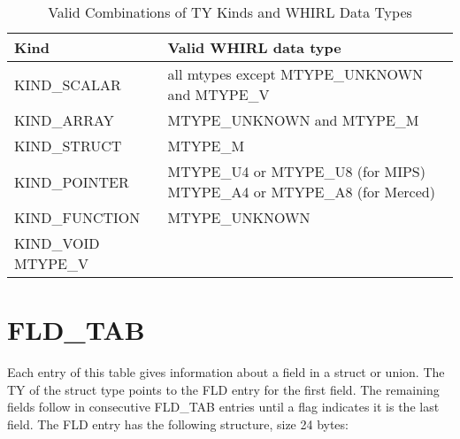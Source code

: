 \begin{table}
\centering
\caption{Valid Combinations of
%
TY Kinds and WHIRL Data Types}
\label{table20}
\begin{tabular}{|l|p{4in}|}\hline
Kind & Valid  WHIRL data type\\\hline\hline
\index{KIND\_SCALAR}%
KIND\_SCALAR & all mtypes except
\index{MTYPE\_UNKNOWN}%
MTYPE\_UNKNOWN and MTYPE\_V\\\hline
\index{KIND\_ARRAY}%
KIND\_ARRAY &
\index{MTYPE\_UNKNOWN}%
MTYPE\_UNKNOWN and
\index{MTYPE\_M}%
MTYPE\_M \\\hline
\index{KIND\_STRUCT}%
KIND\_STRUCT &
\index{MTYPE\_M}%
MTYPE\_M \\\hline
\index{KIND\_POINTER}%
KIND\_POINTER &
\index{MTYPE\_U4}%
MTYPE\_U4 or
\index{MTYPE\_U8}%
MTYPE\_U8 (for MIPS)
\index{MTYPE\_A4}%
MTYPE\_A4 or
\index{MTYPE\_A8}%
MTYPE\_A8 (for Merced) \\\hline
\index{KIND\_FUNCTION}%
KIND\_FUNCTION &
\index{MTYPE\_UNKNOWN}%
MTYPE\_UNKNOWN \\\hline
\index{KIND\_VOID}%
KIND\_VOID
\index{MTYPE\_V}%
MTYPE\_V & \\\hline
\end{tabular}
\end{table}


\section{FLD\_TAB}

Each entry of this table gives information about a field in a struct
or union. The
%
TY of the struct type points to the
%
FLD entry for the
first field.
The remaining fields follow in consecutive
%
FLD\_TAB entries until a
flag indicates it is the last field. The
%
FLD entry has the following
structure, size 24 bytes:

